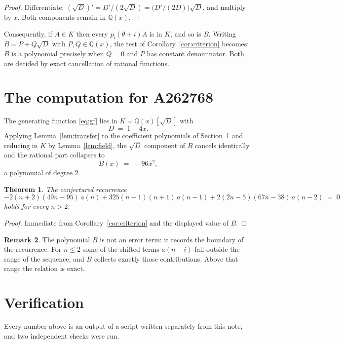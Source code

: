 \documentclass[11pt,a4paper]{article}
\theoremstyle{plain}
\newtheorem{theorem}{Theorem}
\theoremstyle{definition}
\newtheorem{remark}[theorem]{Remark}
\begin{document}
\begin{proof}
Differentiate: $(\sqrt{D})'=D'/(2\sqrt{D})=\bigl(D'/(2D)\bigr)\sqrt{D}$, and multiply by
$x$. Both components remain in $\mathbb{Q}(x)$.
\end{proof}

Consequently, if $A\in K$ then every $p_{i}(\theta+i)A$ is in $K$, and so is $B$. Writing
$B=P+Q\sqrt{D}$ with $P,Q\in\mathbb{Q}(x)$, the test of Corollary~\ref{cor:criterion}
becomes: $B$ is a polynomial precisely when $Q=0$ and $P$ has constant denominator. Both
are decided by exact cancellation of rational functions.

\section{The computation for A262768}

The generating function \eqref{eq:gf} lies in $K=\mathbb{Q}(x)[\sqrt{D}]$ with
\[
D \;=\; 1 - 4 x .
\]
Applying Lemma~\ref{lem:transfer} to the coefficient polynomials of Section~1 and reducing
in $K$ by Lemma~\ref{lem:field}, the $\sqrt{D}$ component of $B$ cancels identically and
the rational part collapses to
\[
B(x)\;=\;- 96 x^{2} ,
\]
a polynomial of degree $2$.

\begin{theorem}
The conjectured recurrence
\[
- 2 \left(n + 2\right) \left(49 n - 95\right)\,a(n) + 325 \left(n - 1\right) \left(n + 1\right)\,a(n-1) + 2 \left(2 n - 5\right) \left(67 n - 38\right)\,a(n-2) \;=\;0
\]
holds for every $n>2$.
\end{theorem}

\begin{proof}
Immediate from Corollary~\ref{cor:criterion} and the displayed value of $B$.
\end{proof}

\begin{remark}
The polynomial $B$ is not an error term: it records the boundary of the recurrence. For
$n\le2$ some of the shifted terms $a(n-i)$ fall outside the range of the sequence,
and $B$ collects exactly those contributions. Above that range the relation is exact.
\end{remark}

\section{Verification}

Every number above is an output of a script written separately from this note, and two
independent checks were run.
\end{document}
